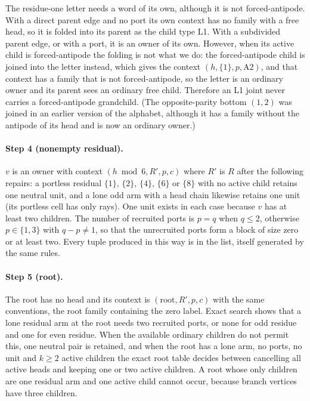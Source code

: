 \documentclass[11pt,a4paper]{article}
\theoremstyle{plain}
\theoremstyle{definition}
\theoremstyle{remark}
\begin{document}
The residue-one letter needs a word of its own, although it is not
forced-antipode.  With a direct parent edge and no port its own context has no
family with a free head, so it is folded into its parent as the child type L1.
With a subdivided parent edge, or with a port, it is an owner of its own.  However, when its
active child is forced-antipode the folding is not what we do: the
forced-antipode child is joined into the letter instead, which gives the
context $(h,\{1\},p,\mathrm{A2})$, and that context has a family that is not
forced-antipode, so the letter is an ordinary owner and its parent sees an
ordinary free child.  Therefore an L1 joint never carries a forced-antipode
grandchild.  (The opposite-parity bottom $(1,2)$ was joined in an earlier
version of the alphabet, although it has a family without the antipode of its
head and is now an ordinary owner.)

\paragraph{Step 4 (nonempty residual).}
$v$ is an owner with context $(h\bmod 6,R',p,c)$ where $R'$ is $R$ after the
following repairs: a portless residual $\{1\}$, $\{2\}$, $\{4\}$, $\{6\}$ or
$\{8\}$ with no active child retains one neutral unit, and a lone odd arm with
a head chain likewise retains one unit (its portless cell has only rays).  One
unit exists in each case because $v$ has at least two children.  The number
of recruited ports is $p=q$ when $q\le 2$, otherwise $p\in\{1,3\}$ with
$q-p\ne 1$, so that the unrecruited ports form a block of size zero or at
least two.  Every tuple produced in this way is in the list, itself
generated by the same rules.

\paragraph{Step 5 (root).}
The root has no head and its context is $(\mathrm{root},R',p,c)$ with the
same conventions, the root family containing the zero label.  Exact search
shows that a lone residual arm at the root needs two recruited ports, or none
for odd residue and one for even residue.  When the available ordinary
children do not permit this, one neutral pair is retained, and when the root
has a lone arm, no ports, no unit and $k\ge 2$ active children the exact root
table decides between cancelling all active heads and keeping one or two
active children.  A root whose only children are one residual arm and one
active child cannot occur, because branch vertices have three children.
\end{document}
